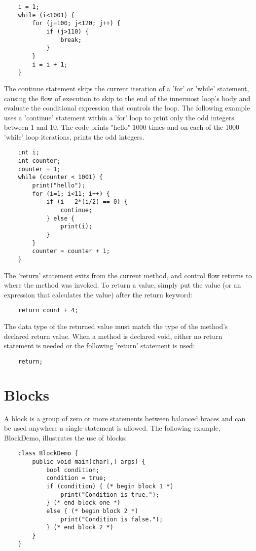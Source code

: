 \begin{homeworkProblem}
\begin{verbatim}
	i = 1;
	while (i<1001) {
		for (j=100; j<120; j++) {
			if (j>110) {
				break;
			}
		}
		i = i + 1;
	}
	\end{verbatim}
	
	The continue statement skips the current iteration of a 'for' or 'while' statement, causing the flow of execution to skip to the end of the innermost loop's body and evaluate the conditional expression that controls the loop.
	The following example uses a 'continue' statement within a 'for' loop to print only the odd integers between 1 and 10. The code prints "hello" 1000 times and on each of the 1000 'while' loop iterations, prints the odd integers.
	
	\begin{verbatim} 
	int i;
	int counter;
	counter = 1;
	while (counter < 1001) {
		print("hello");
		for (i=1; i<11; i++) {
			if (i - 2*(i/2) == 0) {
				continue;
			} else {
				print(i);
			}
		}
		counter = counter + 1;
	}
	\end{verbatim}
	
	
	The 'return' statement exits from the current method, and control flow returns to where the method was invoked. To return a value, simply put the value (or an expression that calculates the value) after the return keyword:
	\begin{verbatim} 
	return count + 4;
	\end{verbatim}
	
	The data type of the returned value must match the type of the method's declared return value. When a method is declared void, either no return statement is needed or the following 'return' statement is used:
	
	\begin{verbatim} 
	return;
	\end{verbatim}
	
	\section{Blocks}
	
	A block is a group of zero or more statements between balanced braces and can be used anywhere a single statement is allowed. The following example, BlockDemo, illustrates the use of blocks:
	
	\begin{verbatim} 
	class BlockDemo {
		public void main(char[,] args) {
			bool condition;
			condition = true;
			if (condition) { (* begin block 1 *)
				print("Condition is true.");
			} (* end block one *)
			else { (* begin block 2 *)
				print("Condition is false.");
			} (* end block 2 *)
		}
	}
	\end{verbatim}
	

\end{homeworkProblem}
